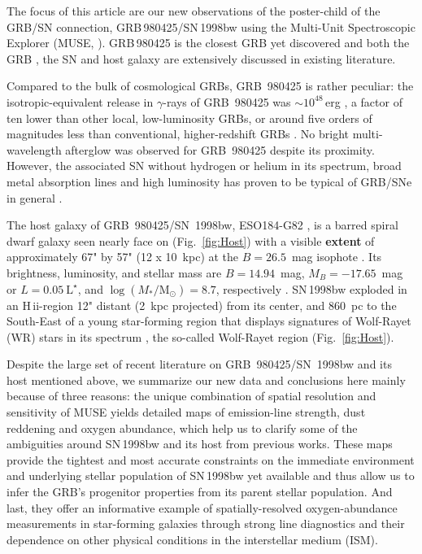 \documentclass[traditabstract, referee]{aa}
\newcommand{\hii}{\mbox{H\,{\sc ii}}}
\begin{document}
The focus of this article are our new observations of the poster-child of the GRB/SN connection, GRB\,980425/SN\,1998bw using the Multi-Unit Spectroscopic Explorer (MUSE, \citealp{2010SPIE.7735E..08B}). GRB\,980425 is the closest GRB yet discovered and both the GRB \citep[e.g.][]{1998Natur.395..670G, 1998Natur.395..663K}, the SN \citep[e.g.][]{1998Natur.395..672I, 2001ApJ...555..900P, 2006ApJ...640..854M} and host galaxy \citep[e.g.][]{2000ApJ...542L..89F, 2005NewA...11..103S, 2006A&A...454..103H, 2009ApJ...693..347M, 2014A&A...562A..70M, 2016arXiv160901742M, 2012ApJ...746....7L, 2015MNRAS.454L..51A} are extensively discussed in existing literature. 

Compared to the bulk of cosmological GRBs, GRB~980425 is rather peculiar: the isotropic-equivalent release in $\gamma$-rays of GRB~980425 was $\sim10^{48}$\,erg \citep{1998Natur.395..670G}, a factor of ten lower than other local, low-luminosity GRBs, or around five orders of magnitudes less than conventional, higher-redshift GRBs \citep{2013ApJ...776...98X}. No bright multi-wavelength afterglow was observed for GRB~980425 despite its proximity. However, the associated SN without hydrogen or helium in its spectrum, broad metal absorption lines and high luminosity has proven to be typical of GRB/SNe in general \citep{2012grbu.book..169H}.

The host galaxy of GRB~980425/SN~1998bw, ESO184-G82 \citep{1989spce.book.....L}, is a barred spiral dwarf galaxy \citep{2000ApJ...542L..89F} seen nearly face on (Fig.~\ref{fig:Host}) with a visible \textbf{extent} of approximately 67" by 57" (12 x 10~kpc) at the $B=26.5$~mag isophote \citep{2005NewA...11..103S}. Its brightness, luminosity, and stellar mass are $B=14.94$~mag, $M_B=-17.65$~mag or $L=0.05~\mathrm{L}^{\star}$, and $\log (M_{*}/\mathrm{M}_{\odot})= 8.7 $, respectively \citep{2005NewA...11..103S, 2014A&A...562A..70M}. SN\,1998bw exploded in an \hii-region 12" distant (2~kpc projected) from its center, and 860~pc to the South-East of a young star-forming region that displays signatures of Wolf-Rayet (WR) stars in its spectrum \citep{2006A&A...454..103H}, the so-called Wolf-Rayet region (Fig.~\ref{fig:Host}).

Despite the large set of recent literature on GRB~980425/SN~1998bw and its host mentioned above, we summarize our new data and conclusions here mainly because of three reasons: the unique combination of spatial resolution and sensitivity of MUSE yields detailed maps of emission-line strength, dust reddening and oxygen abundance, which help us to clarify some of the ambiguities around SN\,1998bw and its host from previous works. These maps provide the tightest and most accurate constraints on the immediate environment and underlying stellar population of SN\,1998bw yet available and thus allow us to infer the GRB's progenitor properties from its parent stellar population. And last, they offer an informative example of spatially-resolved oxygen-abundance measurements in star-forming galaxies through strong line diagnostics and their dependence on other physical conditions in the interstellar medium (ISM).
\end{document}
